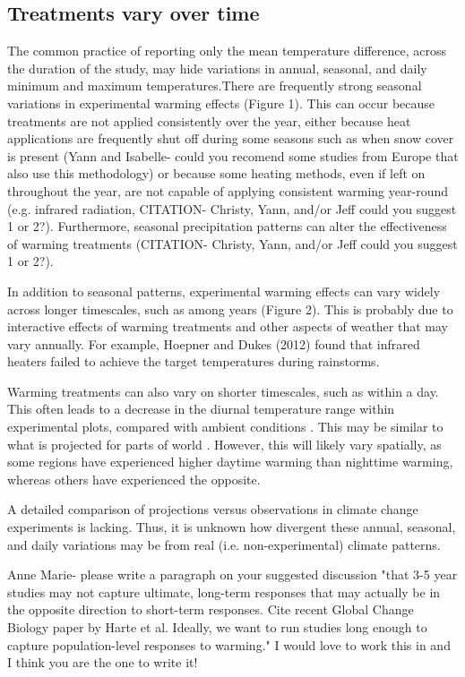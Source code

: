 \documentclass{article}
\begin{document}
\subsection* {Treatments vary over time}
The common practice of reporting only the mean temperature difference, across the duration of the study, may hide variations in annual, seasonal, and daily minimum and maximum temperatures.There are frequently strong seasonal variations in experimental warming effects (Figure 1). This can occur because treatments are not applied consistently over the year, either because heat applications are frequently shut off during some seasons such as when snow cover is present \citep[e.g.][]{clark2014a,clark2014b} (Yann and Isabelle- could you recomend some studies from Europe that also use this methodology) or because some heating methods, even if left on throughout the year, are not capable of applying consistent warming year-round (e.g. infrared radiation, CITATION- Christy, Yann, and/or Jeff could you suggest 1 or 2?). Furthermore, seasonal precipitation patterns can alter the effectiveness of warming treatments (CITATION- Christy, Yann, and/or Jeff could you suggest 1 or 2?). %
\par In addition to seasonal patterns, experimental warming effects can vary widely across longer timescales, such as among years (Figure 2). This is probably due to interactive effects of warming treatments and other aspects of weather that may vary annually. For example, Hoepner and Dukes (2012) found that infrared heaters failed to achieve the target temperatures during rainstorms. 
\par Warming treatments can also vary on shorter timescales, such as within a day. This often leads to a decrease in the diurnal temperature range within experimental plots, compared with ambient conditions \citep{hoeppner2012}. This may be similar to what is projected for parts of world \citep{ipcc2013}. However, this will likely vary spatially, as some regions have experienced higher daytime warming than nighttime warming, whereas others have experienced the opposite\citep{ipcc2013}. 
\par A detailed comparison of projections versus observations in climate change experiments is lacking. Thus, it is unknown how divergent these annual, seasonal, and daily variations may be from real (i.e. non-experimental) climate patterns.  %
\par Anne Marie- please write a paragraph on your suggested discussion "that 3-5 year studies may not capture ultimate, long-term responses that may actually be in the opposite direction to short-term responses.  Cite recent Global Change Biology paper by Harte et al.  Ideally, we want to run studies long enough to capture population-level responses to warming." I would love to work this in and I think you are the one to write it!
\end{document}
